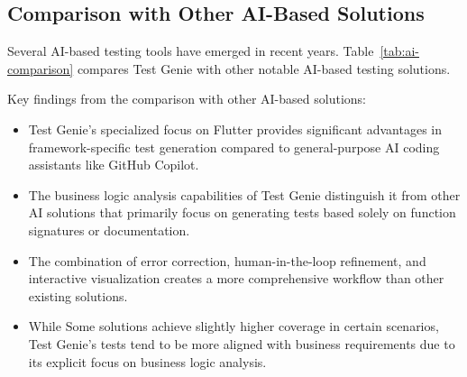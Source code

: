 \subsection{Comparison with Other AI-Based Solutions}

Several AI-based testing tools have emerged in recent years. Table~\ref{tab:ai-comparison} compares Test Genie with other notable AI-based testing solutions.

\begin{table}[ht]
    \centering
    \caption{Comparison with Other AI-Based Testing Solutions}
    \label{tab:ai-comparison}
\end{table}

Key findings from the comparison with other AI-based solutions:

\begin{itemize}
    \item Test Genie's specialized focus on Flutter provides significant advantages in framework-specific test generation compared to general-purpose AI coding assistants like GitHub Copilot.
    
    \item The business logic analysis capabilities of Test Genie distinguish it from other AI solutions that primarily focus on generating tests based solely on function signatures or documentation.
    
    \item The combination of error correction, human-in-the-loop refinement, and interactive visualization creates a more comprehensive workflow than other existing solutions.
    
    \item While Some solutions achieve slightly higher coverage in certain scenarios, Test Genie's tests tend to be more aligned with business requirements due to its explicit focus on business logic analysis.
\end{itemize}

